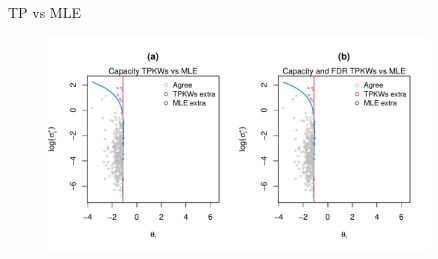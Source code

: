 \documentclass[10pt,mathserif,aspectratio=169]{beamer}
\begin{document}
\begin{frame}{TP vs MLE}
  \begin{figure}
    \centering
    \includegraphics[width=0.9\textwidth]{../../Figures/2013-2022/GMM_m/GLmix/Contour_Left_0.2_0.2_TPKWs_MLE.pdf}
  \end{figure}
\end{frame}
\end{document}
